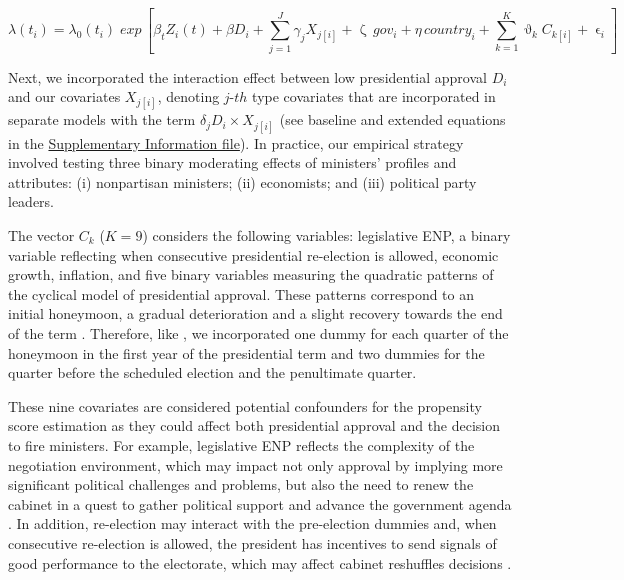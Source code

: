 \documentclass[12pt,halfline,a4paper]{ouparticle}
\begin{document}
\begin{dmath} \label{EQ1} 
\lambda(t_{i}) = \lambda_{0}(t_{i}) \; exp \, \left[ \beta_{t}Z_{i}(t) + \beta D_{i} + \sum_{j = 1}^{J} \gamma_{j} X_{j[i]} + \upzeta \, gov_{i} + \eta \, country_{i} +\sum_{k = 1}^{K} \upvartheta_{k}C_{k[i]} + \upvarepsilon_{i} \right]
\end{dmath}

Next, we incorporated the interaction effect between low presidential approval $D_{i}$ and our covariates $X_{j[i]}$, denoting $j$-$th$ type covariates that are incorporated in separate models with the term $\delta_{j} D_{i} \times X_{j[i]}$ (see baseline and extended equations in the \href{https://osf.io/asgbj/?view_only=144acd6c8eca4836880b57dee85ea4ff}{Supplementary Information file}). In practice, our empirical strategy involved testing three binary moderating effects of ministers’ profiles and attributes: (i) nonpartisan ministers; (ii) economists; and (iii) political party leaders.

The vector $C_{k}$ ($K = 9$) considers the following variables: legislative ENP, a binary variable reflecting when consecutive presidential re-election is allowed, economic growth, inflation, and five binary variables measuring the quadratic patterns of the cyclical model of presidential approval. These patterns correspond to an initial honeymoon, a gradual deterioration and a slight recovery towards the end of the term \cite[][see also \citeauthor{Brace1992}, \citeyear{Brace1992}; \citeauthor{Carlin2018}, \citeyear{Carlin2018}]{Stimson1976}. Therefore, like \cite{Carlin2018}, we incorporated one dummy for each quarter of the honeymoon in the first year of the presidential term and two dummies for the quarter before the scheduled election and the penultimate quarter.

These nine covariates are considered potential confounders for the propensity score estimation as they could affect both presidential approval and the decision to fire ministers. For example, legislative ENP reflects the complexity of the negotiation environment, which may impact not only approval by implying more significant political challenges and problems, but also the need to renew the cabinet in a quest to gather political support and advance the government agenda \citep{Chiba2015, Schleiter2020}. In addition, re-election may interact with the pre-election dummies and, when consecutive re-election is allowed, the president has incentives to send signals of good performance to the electorate, which may affect cabinet reshuffles decisions \citep[][see also \citeauthor{Beckman2020}, \citeyear{Beckman2020}]{Camerlo2015a}.
\end{document}
